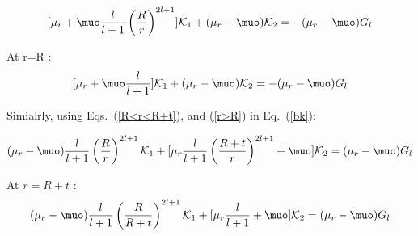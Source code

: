 

$$[\mu_r+\muo\frac{l}{l+1}\left(\dfrac{R}{r}\right)^{2l+1}]\mathcal{K}_1 +(\mu_r-\muo)\mathcal{K}_2=-(\mu_r-\muo)G_l$$

At r=R :
\begin{equation}\label{es1}
[\mu_r+\muo\frac{l}{l+1}]\mathcal{K}_1 +(\mu_r-\muo)\mathcal{K}_2=-(\mu_r-\muo)G_l
\end{equation}

Simialrly, using Eqs.~(\ref{R<r<R+t}), and (\ref{r>R}) in Eq.~(\ref{bk}):


$$(\mu_r-\muo)\frac{l}{l+1}\left(\dfrac{R}{r}\right)^{2l+1}\mathcal{K}_1+[\mu_r\frac{l}{l+1}\left(\dfrac{R+t}{r}\right)^{2l+1}+\muo]\mathcal{K}_2=(\mu_r-\muo)G_l$$

At $r=R+t$ :
\begin{equation}\label{es2}
(\mu_r-\muo)\frac{l}{l+1}\left(\dfrac{R}{R+t}\right)^{2l+1}\mathcal{K}_1+[\mu_r\frac{l}{l+1}+\muo]\mathcal{K}_2=(\mu_r-\muo)G_l
\end{equation}

